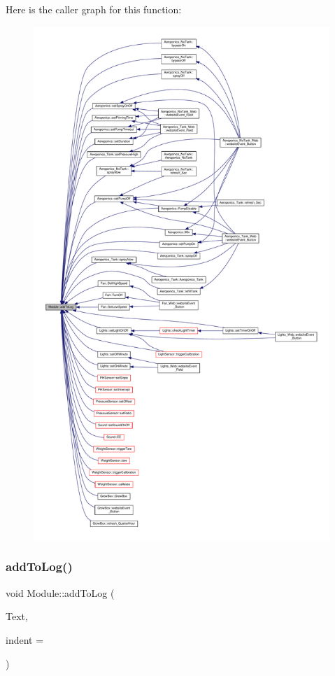 Here is the caller graph for this function\+:
\nopagebreak
\begin{figure}[H]
\begin{center}
\leavevmode
\includegraphics[height=550pt]{class_module_a5dfb18333a2943155a7fd6a4602e00a7_icgraph}
\end{center}
\end{figure}
\mbox{\label{class_module_a5dfb18333a2943155a7fd6a4602e00a7}} 
\subsubsection{\texorpdfstring{add\+To\+Log()}{addToLog()}\hspace{0.1cm}{\footnotesize\ttfamily [2/4]}}
{\footnotesize\ttfamily void Module\+::add\+To\+Log (\begin{DoxyParamCaption}\item[{const \+\_\+\+\_\+\+Flash\+String\+Helper $\ast$}]{Text,  }\item[{byte}]{indent = {} }\end{DoxyParamCaption})}

